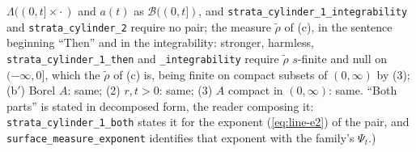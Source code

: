 \begin{proposition}
{$\Lambda((0,t] \times \cdot\,)$ and $a(t)$ as $\mathcal{B}((0,t])$, and
\texttt{strata\_cylinder\_1\_integrability} and \texttt{strata\_cylinder\_2} require no pair; the
measure $\tilde\rho$ of (c), in the sentence beginning ``Then'' and in the integrability:
stronger, harmless, \texttt{strata\_cylinder\_1\_then} and \texttt{\_integrability} require
$\tilde\rho$ $s$-finite and null on $(-\infty, 0]$, which the $\tilde\rho$ of (c) is, being finite
on compact subsets of $(0,\infty)$ by (3); (b$'$) Borel $A$: same; (2) $r, t > 0$: same; (3) $A$
compact in $(0,\infty)$: same. ``Both parts'' is stated in decomposed form, the reader composing it:
\texttt{strata\_cylinder\_1\_both} states it for the exponent (\ref{eq:line-e2}) of the pair, and
\texttt{surface\_measure\_exponent} identifies that exponent with the family's $\Psi_t$.)}
\end{proposition}

